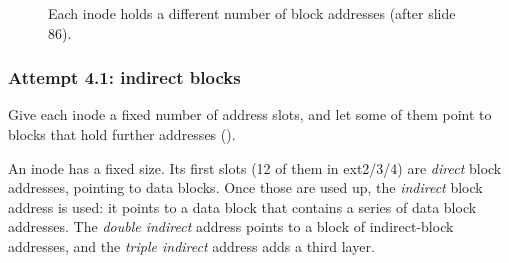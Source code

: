 \begin{figure}[H]
\caption{Each inode holds a different number of block addresses (after slide 86).}
\label{fig:inodevar}
\end{figure}

\subsubsection{Attempt 4.1: indirect blocks}
Give each inode a fixed number of address slots, and let some of them point to blocks that hold further addresses ().

\begin{definition}
  An inode has a fixed size. Its first slots (12 of them in ext2/3/4) are \emph{direct} block addresses, pointing to data blocks. Once those are used up, the \emph{indirect} block address is used: it points to a data block that contains a series of data block addresses. The \emph{double indirect} address points to a block of indirect-block addresses, and the \emph{triple indirect} address adds a third layer.
\end{definition}

